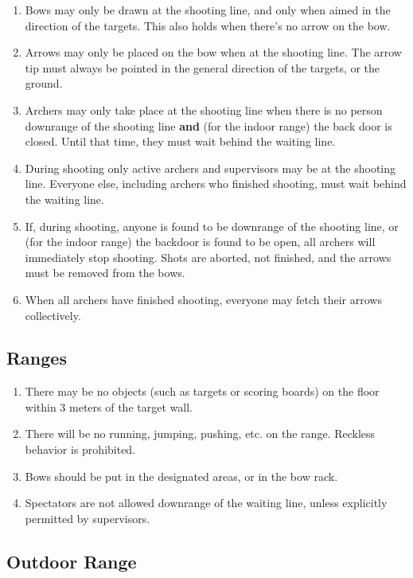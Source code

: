 \documentclass[a4paper]{article}
\begin{document}
\begin{enumerate}
  \item Bows may only be drawn at the shooting line, and only when aimed in the direction of the targets. This also holds when there's no arrow on the bow.
  \item Arrows may only be placed on the bow when at the shooting line. The arrow tip must always be pointed in the general direction of the targets, or the ground.
  \item Archers may only take place at the shooting line when there is no person downrange of the shooting line {\bf and} (for the indoor range) the back door is closed. Until that time, they must wait behind the waiting line.
  \item During shooting only active archers and supervisors may be at the shooting line. Everyone else, including archers who finished shooting, must wait behind the waiting line.
  \item If, during shooting, anyone is found to be downrange of the shooting line, or (for the indoor range) the backdoor is found to be open, all archers will immediately stop shooting. Shots are aborted, not finished, and the arrows must be removed from the bows.
  \item When all archers have finished shooting, everyone may fetch their arrows collectively.
\end{enumerate}

\subsection{Ranges}

\begin{enumerate}
  \item There may be no objects (such as targets or scoring boards) on the floor within 3 meters of the target wall.
  \item There will be no running, jumping, pushing, etc. on the range. Reckless behavior is prohibited.
  \item Bows should be put in the designated areas, or in the bow rack.
  \item Spectators are not allowed downrange of the waiting line, unless explicitly permitted by supervisors.
\end{enumerate}

\subsection{Outdoor Range}
\label{rules:outdoor}
\end{document}
